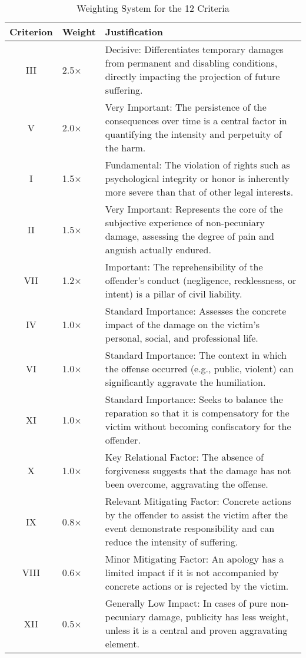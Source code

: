 \documentclass[11pt,a4paper]{article}
\begin{document}
\begin{table}[ht]
\centering
\caption{Weighting System for the 12 Criteria}
\label{tab:weights}
\small
\begin{tabular}{@{}clp{8cm}@{}}
\toprule
\textbf{Criterion} & \textbf{Weight} & \textbf{Justification} \\ 
\midrule
III & 2.5× & Decisive: Differentiates temporary damages from permanent and disabling conditions, directly impacting the projection of future suffering. \\
V & 2.0× & Very Important: The persistence of the consequences over time is a central factor in quantifying the intensity and perpetuity of the harm. \\
I & 1.5× & Fundamental: The violation of rights such as psychological integrity or honor is inherently more severe than that of other legal interests. \\
II & 1.5× & Very Important: Represents the core of the subjective experience of non-pecuniary damage, assessing the degree of pain and anguish actually endured. \\
VII & 1.2× & Important: The reprehensibility of the offender's conduct (negligence, recklessness, or intent) is a pillar of civil liability. \\
IV & 1.0× & Standard Importance: Assesses the concrete impact of the damage on the victim's personal, social, and professional life. \\
VI & 1.0× & Standard Importance: The context in which the offense occurred (e.g., public, violent) can significantly aggravate the humiliation. \\
XI & 1.0× & Standard Importance: Seeks to balance the reparation so that it is compensatory for the victim without becoming confiscatory for the offender. \\
X & 1.0× & Key Relational Factor: The absence of forgiveness suggests that the damage has not been overcome, aggravating the offense. \\
IX & 0.8× & Relevant Mitigating Factor: Concrete actions by the offender to assist the victim after the event demonstrate responsibility and can reduce the intensity of suffering. \\
VIII & 0.6× & Minor Mitigating Factor: An apology has a limited impact if it is not accompanied by concrete actions or is rejected by the victim. \\
XII & 0.5× & Generally Low Impact: In cases of pure non-pecuniary damage, publicity has less weight, unless it is a central and proven aggravating element. \\
\bottomrule
\end{tabular}
\end{table}
\end{document}
